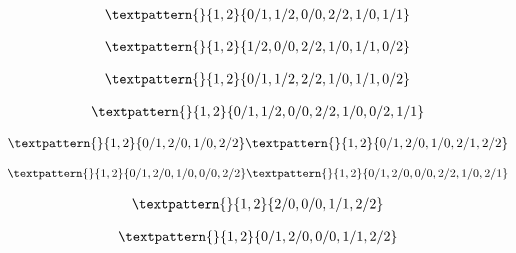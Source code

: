 \begin{equation}
	\begin{gathered}
		\textpattern{}{1,2}{0/1,1/2,0/0,2/2,1/0,1/1}
	\end{gathered}
	\label{cls:110}
\end{equation}

\begin{equation}
	\begin{gathered}
		\textpattern{}{1,2}{1/2,0/0,2/2,1/0,1/1,0/2}
	\end{gathered}
	\label{cls:111}
\end{equation}

\begin{equation}
	\begin{gathered}
		\textpattern{}{1,2}{0/1,1/2,2/2,1/0,1/1,0/2}
	\end{gathered}
	\label{cls:112}
\end{equation}

\begin{equation}
	\begin{gathered}
		\textpattern{}{1,2}{0/1,1/2,0/0,2/2,1/0,0/2,1/1}
	\end{gathered}
	\label{cls:113}
\end{equation}

\begin{equation}
	\begin{gathered}
		\textpattern{}{1,2}{0/1,2/0,1/0,2/2}
		\textpattern{}{1,2}{0/1,2/0,1/0,2/1,2/2}
	\end{gathered}
	\label{cls:114}
\end{equation}

\begin{equation}
	\begin{gathered}
		\textpattern{}{1,2}{0/1,2/0,1/0,0/0,2/2}
		\textpattern{}{1,2}{0/1,2/0,0/0,2/2,1/0,2/1}
	\end{gathered}
	\label{cls:115}
\end{equation}

\begin{equation}
	\begin{gathered}
		\textpattern{}{1,2}{2/0,0/0,1/1,2/2}
	\end{gathered}
	\label{cls:116}
\end{equation}

\begin{equation}
	\begin{gathered}
		\textpattern{}{1,2}{0/1,2/0,0/0,1/1,2/2}
	\end{gathered}
	\label{cls:117}
\end{equation}


